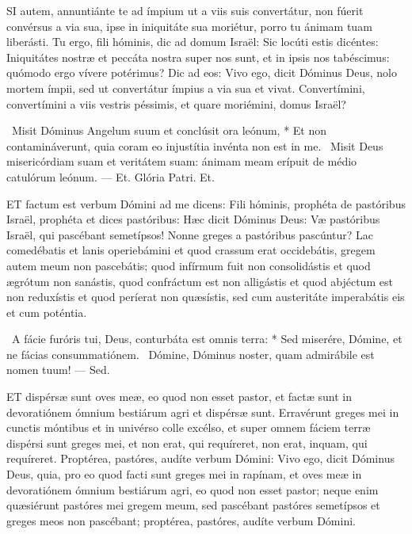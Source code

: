 

\lettrine[lines=2]{S}{I} autem, annuntiánte te ad ímpium ut a viis suis convertátur, non fúerit convérsus a via sua, ipse in iniquitáte sua moriétur, porro tu ánimam tuam liberásti. Tu ergo, fili hóminis, dic ad domum Israël: Sic locúti estis dicéntes: Iniquitátes nostræ et peccáta nostra super nos sunt, et in ipsis nos tabéscimus: quómodo ergo vívere potérimus? Dic ad eos: Vivo ego, dicit Dóminus Deus, nolo mortem ímpii, sed ut convertátur ímpius a via sua et vivat. Convertímini, convertímini a viis vestris péssimis, et quare moriémini, domus Israël?

\R\ Misit Dóminus Angelum suum et conclúsit ora leónum, * Et non contamináverunt, quia coram eo injustítia invénta non est in me. \V\ Misit Deus misericórdiam suam et veritátem suam: ánimam meam erípuit de médio catulórum leónum. — Et. Glória Patri. Et.




\lettrine[lines=2]{E}{T} factum est verbum Dómini ad me dicens: Fili hóminis, prophéta de pastóribus Israël, prophéta et dices pastóribus: Hæc dicit Dóminus Deus: Væ pastóribus Israël, qui pascébant semetípsos! Nonne greges a pastóribus pascúntur? Lac comedébatis et lanis operiebámini et quod crassum erat occidebátis, gregem autem meum non pascebátis; quod infírmum fuit non consolidástis et quod ægrótum non sanástis, quod confráctum est non alligástis et quod abjéctum est non reduxístis et quod períerat non quæsístis, sed cum austeritáte imperabátis eis et cum poténtia.

\R\ A fácie furóris tui, Deus, conturbáta est omnis terra: * Sed miserére, Dómine, et ne fácias consummatiónem. \V\ Dómine, Dóminus noster, quam admirábile est nomen tuum! — Sed.


\lettrine[lines=2]{E}{T} dispérsæ sunt oves meæ, eo quod non esset pastor, et factæ sunt in devoratiónem ómnium bestiárum agri et dispérsæ sunt. Erravérunt greges mei in cunctis móntibus et in univérso colle excélso, et super omnem fáciem terræ dispérsi sunt greges mei, et non erat, qui requíreret, non erat, inquam, qui requíreret. Proptérea, pastóres, audíte verbum Dómini: Vivo ego, dicit Dóminus Deus, quia, pro eo quod facti sunt greges mei in rapínam, et oves meæ in devoratiónem ómnium bestiárum agri, eo quod non esset pastor; neque enim quæsiérunt pastóres mei gregem meum, sed pascébant pastóres semetípsos et greges meos non pascébant; proptérea, pastóres, audíte verbum Dómini.

